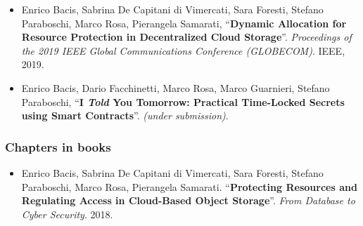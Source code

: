 {\begin{itemize}
	\nocite{percom}
	
	\nocite{globecom}
	\item Enrico Bacis, Sabrina De Capitani di Vimercati, Sara Foresti, Stefano Paraboschi, Marco Rosa, Pierangela Samarati, ``\textbf{Dynamic Allocation for Resource Protection in Decentralized Cloud Storage}''. {\em Proceedings of the 2019 IEEE Global Communications Conference (GLOBECOM)}. IEEE, 2019.
	
	\nocite{ityt}
	\item Enrico Bacis, Dario Facchinetti, Marco Rosa, Marco Guarnieri, Stefano Paraboschi, ``\textbf{I {\em Told} You Tomorrow: Practical Time-Locked Secrets using Smart Contracts}''. {\em (under submission)}.
\end{itemize}

\subsubsection*{Chapters in books}
\begin{itemize}
	\nocite{sushil}
	\item  Enrico Bacis,	Sabrina De Capitani di Vimercati, Sara Foresti,	Stefano Paraboschi,	Marco Rosa,	Pierangela Samarati. ``\textbf{Protecting Resources and Regulating Access in Cloud-Based Object Storage}''. {\em From Database to Cyber Security}. 2018.
\end{itemize}

} %